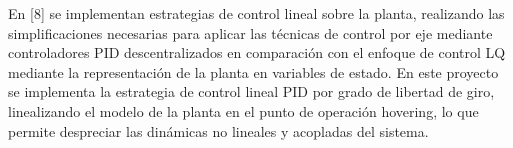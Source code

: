 \documentclass[../main.tex]{subfiles}
\begin{document}
En {[}8{]} se implementan estrategias de control lineal sobre la planta,
realizando las simplificaciones necesarias para aplicar las técnicas
de control por eje mediante controladores PID descentralizados en
comparación con el enfoque de control LQ mediante la representación
de la planta en variables de estado. En este proyecto se implementa
la estrategia de control lineal PID por grado de libertad de giro,
linealizando el modelo de la planta en el punto de operación hovering,
lo que permite despreciar las dinámicas no lineales y acopladas del
sistema.

\textcompwordmark{}
\end{document}
